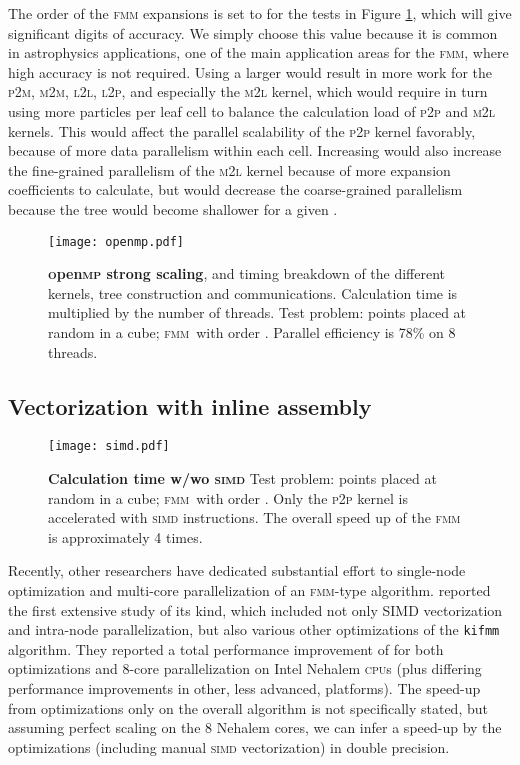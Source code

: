 \documentclass[10pt,twocolumn]{article}
\newcommand{\fmm}{\textsc{fmm}\xspace}
\newcommand{\cpu}{\textsc{cpu}}
\newcommand{\simd}{\textsc{simd}\xspace}
\newcommand{\openmp}{\textsc{o}pen\textsc{mp}\xspace}
\newcommand{\MM}{\textsc{m}2\textsc{m}\xspace}
\newcommand{\PM}{\textsc{p}2\textsc{m}\xspace}
\newcommand{\ML}{\textsc{m}2\textsc{l}\xspace}
\newcommand{\LL}{\textsc{l}2\textsc{l}\xspace}
\newcommand{\LP}{\textsc{l}2\textsc{p}\xspace}
\newcommand{\PP}{\textsc{p}2\textsc{p}\xspace}
\newlength{\up}
\begin{document}
The order of the \fmm expansions is set to  for the tests in Figure \ref{fig:openmp}, which will give  significant digits  of accuracy. We simply choose this value because it is common in astrophysics applications,  one of the main application areas for the \fmm, where high accuracy is not required. Using a larger  would result in more work for the \PM, \MM, \LL, \LP, and especially the \ML kernel, which would require in turn using more particles per leaf cell to balance the calculation load of \PP and \ML kernels. This would affect the parallel scalability of the \PP kernel favorably, because of more data parallelism within each cell. Increasing  would also increase the fine-grained parallelism of the \ML kernel because of more expansion coefficients to calculate, but would decrease the coarse-grained parallelism because the tree would become shallower for a given .

\begin{figure}[t]
\begin{center}
\texttt{[image: openmp.pdf]}
\end{center}
\vspace{-0.5em}\caption{\textbf{\openmp strong scaling}, and timing breakdown of the different kernels, tree construction and communications. Calculation time is multiplied by the number of threads. Test problem:  points placed at random in a cube; \fmm\ with  order .  Parallel efficiency is 78\% on 8 threads.}
\label{fig:openmp}
\end{figure}




\subsection{Vectorization with inline assembly}

\begin{figure}[t]
\begin{center}
\texttt{[image: simd.pdf]}
\end{center}
\vspace{-0.5em}\caption{\textbf{Calculation time w/wo \simd} Test problem:  points placed at random in a cube; \fmm\ with  order . Only the \PP kernel is accelerated with \simd instructions. The overall speed up of the \fmm is approximately 4 times.}
\label{fig:simd}
\end{figure}

Recently, other researchers have dedicated substantial effort to single-node optimization and multi-core parallelization of an \fmm-type algorithm. \cite{ChandramowlishwaranETal2010} reported the first extensive study of its kind, which included not only SIMD vectorization and intra-node parallelization, but also various other optimizations of the \texttt{kifmm} algorithm. They reported a total performance improvement of  for both optimizations and 8-core parallelization on Intel Nehalem \cpu s (plus differing performance improvements in other, less advanced, platforms). The speed-up from optimizations only on the overall algorithm is not specifically stated, but assuming perfect scaling on the 8 Nehalem cores,  we can infer a  speed-up by the optimizations (including manual \simd vectorization) in double precision.
\end{document}
